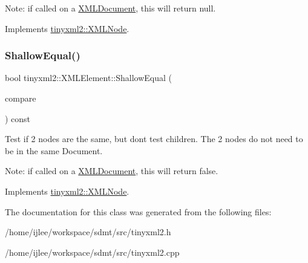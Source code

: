 Note\+: if called on a \hyperlink{classtinyxml2_1_1_x_m_l_document}{X\+M\+L\+Document}, this will return null. 

Implements \hyperlink{classtinyxml2_1_1_x_m_l_node_a8402cbd3129d20e9e6024bbcc0531283}{tinyxml2\+::\+X\+M\+L\+Node}.

\mbox{\label{classtinyxml2_1_1_x_m_l_element_a61ffd7bf918a9db4aa6203d855ac5ec2}} 
\subsubsection{\texorpdfstring{Shallow\+Equal()}{ShallowEqual()}}
{\footnotesize\ttfamily bool tinyxml2\+::\+X\+M\+L\+Element\+::\+Shallow\+Equal (\begin{DoxyParamCaption}\item[{const \hyperlink{classtinyxml2_1_1_x_m_l_node}{X\+M\+L\+Node} $\ast$}]{compare }\end{DoxyParamCaption}) const\hspace{0.3cm}{\ttfamily [virtual]}}

Test if 2 nodes are the same, but don\textquotesingle{}t test children. The 2 nodes do not need to be in the same Document.

Note\+: if called on a \hyperlink{classtinyxml2_1_1_x_m_l_document}{X\+M\+L\+Document}, this will return false. 

Implements \hyperlink{classtinyxml2_1_1_x_m_l_node_a7ce18b751c3ea09eac292dca264f9226}{tinyxml2\+::\+X\+M\+L\+Node}.



The documentation for this class was generated from the following files\+:\begin{DoxyCompactItemize}
\item 
/home/ijlee/workspace/sdmt/src/tinyxml2.\+h\item 
/home/ijlee/workspace/sdmt/src/tinyxml2.\+cpp\end{DoxyCompactItemize}
